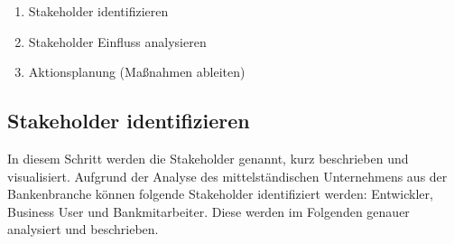\begin{enumerate}
 \item Stakeholder identifizieren
 \item Stakeholder Einfluss analysieren
 \item Aktionsplanung (Maßnahmen ableiten)
\end{enumerate} \cite{salzsearch}


\subsection{Stakeholder identifizieren}
In diesem Schritt werden die Stakeholder genannt, kurz beschrieben und visualisiert. 
Aufgrund der Analyse des mittelständischen Unternehmens aus der Bankenbranche können folgende Stakeholder identifiziert werden: Entwickler, Business User und Bankmitarbeiter.
Diese werden im Folgenden genauer analysiert und beschrieben. 


